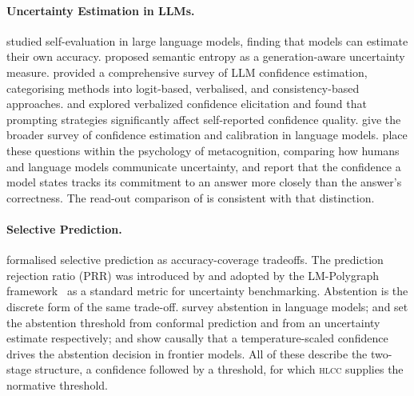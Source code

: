 \documentclass[11pt,a4paper]{article}
\newcommand{\hlcc}{\textsc{hlcc}}
\begin{document}
\paragraph{Uncertainty Estimation in LLMs.}
\citet{kadavath2022language} studied self-evaluation in large language
models, finding that models can estimate their own accuracy.
\citet{kuhn2023semantic} proposed semantic entropy as a
generation-aware uncertainty measure.  \citet{xiong2024llms} provided a
comprehensive survey of LLM confidence estimation, categorising methods
into logit-based, verbalised, and consistency-based
approaches.  \citet{lin2024generating} and \citet{tian2023just} explored
verbalized confidence elicitation and found that prompting strategies
significantly affect self-reported confidence quality.
\citet{geng2024survey} give the broader survey of confidence estimation
and calibration in language models.  \citet{steyvers2026metacognition}
place these questions within the psychology of metacognition, comparing
how humans and language models communicate uncertainty, and
\citet{kumaran2026commitment} report that the confidence a model states
tracks its commitment to an answer more closely than the answer's
correctness.  The read-out comparison of  is
consistent with that distinction.

\paragraph{Selective Prediction.}
\citet{geifman2017selective} formalised selective prediction as
accuracy-coverage tradeoffs.  The prediction rejection ratio (PRR) was
introduced by \citet{malinin2017predictive} and adopted by the
LM-Polygraph framework~\cite{fadeeva2024lmpolygraph} as a standard
metric for uncertainty benchmarking.  Abstention is the discrete form of
the same trade-off.  \citet{wen2025knowlimits} survey abstention in
language models; \citet{yadkori2024conformal} and
\citet{tomani2024uncertainty} set the abstention threshold from conformal
prediction and from an uncertainty estimate respectively; and
\citet{kumaran2026causal} show causally that a temperature-scaled
confidence drives the abstention decision in frontier models.  All of
these describe the two-stage structure, a confidence followed by a
threshold, for which \hlcc{} supplies the normative threshold.
\end{document}
